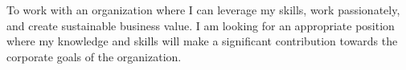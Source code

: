 
To work with an organization where I can leverage my skills, work passionately, and create sustainable business value. I am looking for an appropriate position where my knowledge and skills will make a significant contribution towards the corporate goals of the organization.